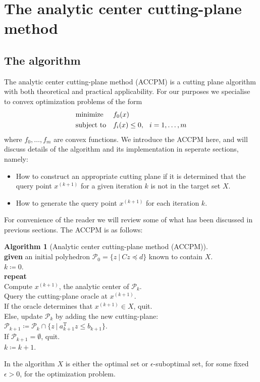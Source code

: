 \documentclass[11pt]{amsart}
\theoremstyle{definition}
\newtheorem{algorithm}{Algorithm}[section]
\theoremstyle{remark}
\newcommand{\ind}{\hspace*{0.5cm}}
\newcommand{\gap}{\hspace*{0.25cm}}
\newcommand{\transpose}{\text{T}}
\begin{document}
\section{The analytic center cutting-plane method}
    \subsection{The algorithm}
        The analytic center cutting-plane method (ACCPM) is a cutting plane algorithm with both theoretical and practical applicability. For our purposes we specialise to convex optimization problems of the form 
        \begin{equation*}
            \begin{aligned}
            & {\text{minimize}} && f_0(x) \\
            & \text{subject to} && f_i(x) \leq 0, \gap i = 1, \dots, m
            \end{aligned}
        \end{equation*}
        where $f_0, \dots, f_m$ are convex functions. We introduce the ACCPM here, and will discuss details of the algorithm and its implementation in seperate sections, namely:
        \begin{itemize}
            \item How to construct an appropriate cutting plane if it is determined that the query point $x^{(k+1)}$ for a given iteration $k$ is not in the target set $X$.
            \item How to generate the query point $x^{(k+1)}$ for each iteration $k$.
        \end{itemize}
        For convenience of the reader we will review some of what has been discussed in previous sections. The ACCPM is as follows: 
        \begin{algorithm}[Analytic center cutting-plane method (ACCPM)]
        \label{a:basic_conceptual_cp_alg}\mbox{}\\
            \ind \textbf{given} an initial polyhedron $\mathcal{P}_0 = \{z \:|\: Cz \preceq d\}$ known to contain $X$. \\
            \ind $k \coloneqq 0$. \\
            \ind \textbf{repeat} \\
            \ind\ind Compute $x^{(k+1)}$, the analytic center of $\mathcal{P}_k$. \\
            \ind\ind Query the cutting-plane oracle at $x^{(k+1)}$. \\
            \ind\ind If the oracle determines that $x^{(k+1)} \in X$, quit. \\
            \ind\ind Else, update $\mathcal{P}_k$ by adding the new cutting-plane: $\mathcal{P}_{k+1} \coloneqq \mathcal{P}_k \cap \{z \:|\: a_{k+1}^\transpose z \leq b_{k+1} \}$. \\
            \ind\ind If $\mathcal{P}_{k+1} = \emptyset$, quit. \\
            \ind\ind $k \coloneqq k+1$.
        \end{algorithm}
        In the algorithm $X$ is either the optimal set or $\epsilon$-suboptimal set, for some fixed $\epsilon > 0$, for the optimization problem.
\end{document}
